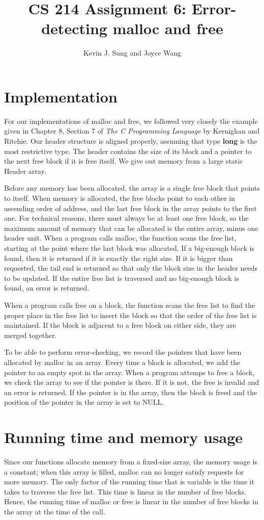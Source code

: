 \documentclass{article}
\title{CS 214 Assignment 6: Error-detecting malloc and free}
\author{Kevin J. Sung and Joyce Wang}
\begin{document}
\maketitle

\section{Implementation}

For our implementations of malloc and free, we followed very closely the example given in Chapter 8, Section 7 of
\emph{The C Programming Language} by Kernighan and Ritchie. Our header structure is aligned properly, assuming
that type \textbf{long} is the most restrictive type. The header contains the size of its block and a pointer
to the next free block if it is free itself. We give out memory from a large static Header array.

Before any memory has been allocated, the array is a single free block that points to itself. When memory is
allocated, the free blocks point to each other in ascending order of address, and the last free block in the
array points to the first one. For technical reasons, there must always be at least one free block, so the 
maximum amount of memory that can be allocated is the entire array, minus one header unit. When a program calls
malloc, the function scans the free list, starting at the point where the last block was allocated. If a
big-enough block is found, then it is returned if it is exactly the right size. If it is bigger than requested,
the tail end is returned so that only the block size in the header needs to be updated. If the entire free list
is traversed and no big-enough block is found, an error is returned.

When a program calls free on a block, the function scans the free list to find the proper place in the free list
to insert the block so that the order of the free list is maintained. If the block is adjacent to a free block
on either side, they are merged together.

To be able to perform error-checking, we record the pointers that have been allocated by malloc in an array.
Every time a block is allocated, we add the pointer to an empty spot in the array. When a program attemps to free
a block, we check the array to see if the pointer is there. If it is not, the free is invalid and an error is
returned. If the pointer is in the array, then the block is freed and the position of the pointer in the array is
set to NULL.

\section{Running time and memory usage}

Since our functions allocate memory from a fixed-size array, the memory usage is a constant; when this array is
filled, malloc can no longer satisfy requests for more memory. The only factor of the running time that is variable
is the time it takes to traverse the free list. This time is linear in the number of free blocks. Hence, the running
time of malloc or free is linear in the number of free blocks in the array at the time of the call.
\end{document}
